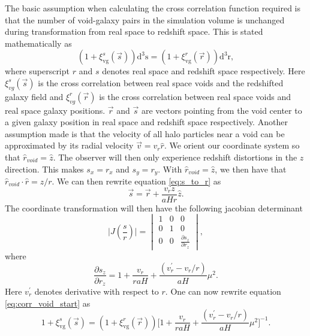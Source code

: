 The basic assumption when calculating the cross correlation function
required is that the number of void-galaxy pairs in the simulation volume is
unchanged during transformation from real space to redshift space. This is stated
mathematically as
\begin{equation}\label{eq:corr_void_start}
    (1 + \xi^s_{\mathrm{vg}}(\vec{s}))\mathrm{d}^3\mathrm{s}=(1 + \xi^r_{\mathrm{vg}}(\vec{r}))\mathrm{d}^3\mathrm{r},
\end{equation}
where superscript $r$ and $s$ denotes real space and redshift space respectively.
Here $\xi^s_{vg}(\vec{s})$ is the cross correlation between real space voids and
the redshifted galaxy field and $\xi^r_{vg}(\vec{r})$ is the cross correlation
between real space voids and real space galaxy positions. $\vec{r}$ and $\vec{s}$
are vectors pointing from the void center to a given galaxy position in
real space and redshift space respectively. Another assumption made
is that the velocity of all halo particles near a void can be approximated by
its radial velocity $\vec{v}=v_r \hat{r}$. We orient our coordinate system so that
$\hat{r}_{void}=\hat{z}$. The observer will then only experience redshift
distortions in the $z$ direction. This makes $s_x=r_x$ and $s_y=r_y$. With $\hat{r}_{void}=\hat{z}$, we then have that
$\hat{r}_{void}\cdot\hat{r}=z/r$. We can then rewrite equation \ref{eq:s_to_r}
as
\begin{equation}\label{eq:s_tp_r}
    \vec{s}=\vec{r}+\frac{v_rz}{aHr}\hat{z}.
\end{equation}
The coordinate transformation will then have the
following jacobian determinant
\begin{equation}
    \vert J(\frac{s}{r})\vert=
    \begin{vmatrix}
        1 & 0 & 0\\
        0 & 1 & 0\\
        0 & 0 & \frac{\partial s_z}{\partial r_z} 
    \end{vmatrix},
\end{equation}
where
\begin{equation}
    \frac{\partial s_z}{\partial r_z} = 1 + \frac{v_r}{raH}+\frac{(v_r^\prime-v_r/r)}{aH}\mu^2.
\end{equation}
Here $v_r^\prime$ denotes derivative with respect to $r$. One can now rewrite
equation \ref{eq:corr_void_start} as
\begin{equation}\label{eq:corr_temp}
    1 + \xi^s_{\mathrm{vg}}(\vec{s})=(1 + \xi^r_{\mathrm{vg}}(\vec{r})) \Big[1 + \frac{v_r}{raH}+\frac{(v_r^\prime-v_r/r)}{aH}\mu^2 \Big]^{-1}.
\end{equation}

